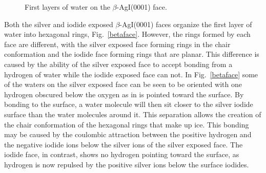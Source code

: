 \documentclass[titlepage]{article}
\begin{document}
\begin{figure}[htp]
	\begin{center}
	\end{center}
	\label{beta0001}
	\caption{First layers of water on the $\beta$-AgI(0001) face.}
\end{figure}

\indent Both the silver and iodide exposed $\beta$-AgI(0001) faces organize the first layer of water into hexagonal rings, Fig.~\ref{betaface}.  However, the rings formed by each face are different, with the silver exposed face forming rings in the chair conformation and the iodide face forming rings that are planar.  This difference is caused by the ability of the silver exposed face to accept bonding from a hydrogen of water while the iodide exposed face can not.  In Fig.~\ref{betaface} some of the waters on the silver exposed face can be seen to be oriented with one hydrogen obscured below the oxygen as in is pointed toward the surface.  By bonding to the surface, a water molecule will then sit closer to the silver iodide surface than the water molecules around it.  This separation allows the creation of the chair conformation of the hexagonal rings that make up ice.  This bonding may be caused by the coulombic attraction between the positive hydrogen and the negative iodide ions below the silver ions of the silver exposed face.  The iodide face, in contrast, shows no hydrogen pointing toward the surface, as hydrogen is now repulsed by the positive silver ions below the surface iodides.	\\
\end{document}
